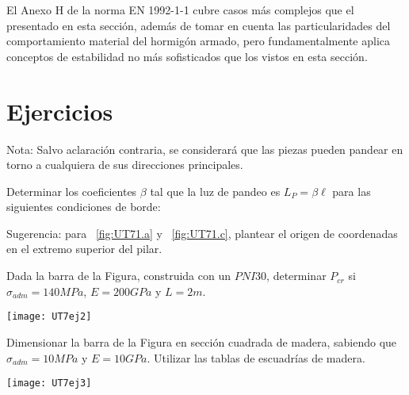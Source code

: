 El Anexo H de la norma EN 1992-1-1 cubre casos más complejos que el presentado en esta sección, además de tomar en cuenta las particularidades del comportamiento material del hormigón armado, pero fundamentalmente aplica conceptos de estabilidad no más sofisticados que los vistos en esta sección.



\section{Ejercicios}
\setcounter{ejercicio}{0}

Nota: Salvo aclaración contraria, se considerará que las piezas pueden pandear en torno a cualquiera de sus direcciones principales.

\ejercicio 

Determinar los coeficientes $\beta$ tal que la luz de pandeo es $L_P=\beta\ell$ para las siguientes condiciones de borde:

\begin{figure}[htb]
	\centering
\subfloat[]{
\texttt{[image: UT7ej1-a]}
	\label{fig:UT71.a}}
\hspace{0.1\textwidth}
\subfloat[]{
\texttt{[image: UT7ej1-b]}
	\label{fig:UT71.b}}
	\hspace{0.1\textwidth}
\subfloat[]{
\texttt{[image: UT7ej1-c]}
	\label{fig:UT71.c}}
\caption{}
	\label{fig:UT71}
\end{figure}

Sugerencia: para ~\ref{fig:UT71.a} y ~\ref{fig:UT71.c}, plantear el origen de coordenadas en el extremo superior del pilar.

\ejercicio 

Dada la barra de la Figura, construida con un $PNI30$, determinar $P_{cr}$ si $\sigma_{adm}=140MPa$, $E=200GPa$ y $L=2m$.

\begin{center}
	\texttt{[image: UT7ej2]}
\end{center}

\ejercicio 

Dimensionar la barra de la Figura en sección cuadrada de madera, sabiendo que $\sigma_{adm}=10MPa$ y $E=10GPa$. Utilizar las tablas de escuadrías de madera.

\begin{center}
\texttt{[image: UT7ej3]}
\end{center}

